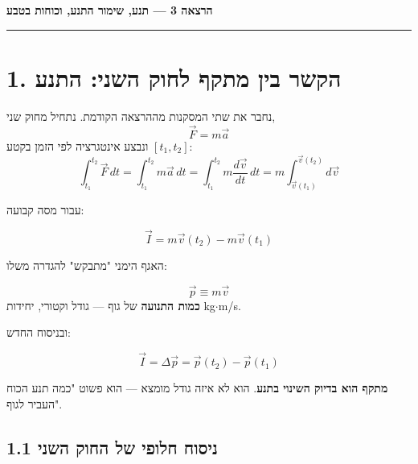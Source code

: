 \documentclass[12pt, a4paper]{article}
\newcommand{\hvec}[1]{\overrightarrow{#1}}
\begin{document}

\begin{center}
  {\LARGE\bfseries הרצאה 3 --- תנע, שימור התנע, וכוחות בטבע}\\[6pt]
  \rule{\linewidth}{0.8pt}
\end{center}
\vspace{0.5cm}

\section*{1. הקשר בין מתקף לחוק השני: התנע}

נחבר את שתי המסקנות מההרצאה הקודמת. נתחיל מחוק שני,
\[
  \hvec{F} = m\hvec{a}
\]
ונבצע אינטגרציה לפי הזמן בקטע \textenglish{$[t_1, t_2]$}:
\[
  \int_{t_1}^{t_2} \hvec{F}\,dt = \int_{t_1}^{t_2} m\hvec{a}\,dt
  = \int_{t_1}^{t_2} m\frac{d\hvec{v}}{dt}\,dt = m\int_{\hvec{v}(t_1)}^{\hvec{v}(t_2)} d\hvec{v}
\]

עבור מסה קבועה:

\begin{tcolorbox}[resultbox]
\[
  \hvec{I} = m\hvec{v}(t_2) - m\hvec{v}(t_1)
\]
\end{tcolorbox}

האגף הימני "מתבקש" להגדרה משלו:

\begin{tcolorbox}[defbox, title={תנע (\textenglish{Momentum})}]
\[
  \hvec{p} \equiv m\hvec{v}
\]
\textbf{כמות התנועה} של גוף --- גודל וקטורי, יחידות \textenglish{kg$\cdot$m/s}.
\end{tcolorbox}

ובניסוח החדש:

\begin{tcolorbox}[resultbox, title={משפט מתקף-תנע}]
\[
  \hvec{I} = \Delta\hvec{p} = \hvec{p}(t_2) - \hvec{p}(t_1)
\]
\end{tcolorbox}

\begin{tcolorbox}[notebox, title={מסקנה רעיונית}]
\textbf{מתקף הוא בדיוק השינוי בתנע}. הוא לא איזה גודל מומצא --- הוא פשוט "כמה תנע הכוח העביר לגוף".
\end{tcolorbox}

\subsection*{1.1 ניסוח חלופי של החוק השני}
\end{document}
